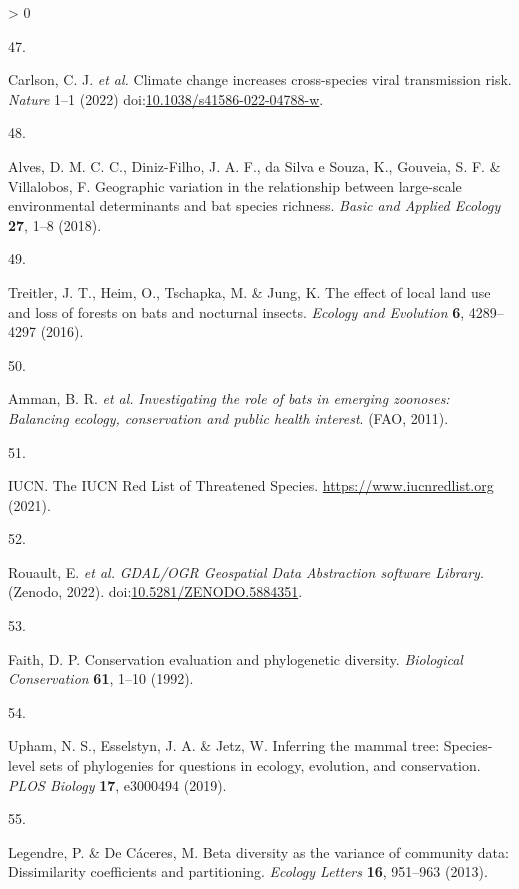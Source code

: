 \documentclass[11pt]{article}
\newlength{\cslhangindent}
\newlength{\csllabelwidth}
\newenvironment{CSLReferences}[3] %
 {%
  \setlength{\parindent}{0pt}
  \ifodd #1 \everypar{\setlength{\hangindent}{\cslhangindent}}\ignorespaces\fi
  \ifnum #2 > 0
  \setlength{\parskip}{#2\baselineskip}
  \fi
 }%
 {}
\newcommand{\CSLLeftMargin}[1]{\parbox[t]{\maxof{\widthof{#1}}{\csllabelwidth}}{#1}}
\newcommand{\CSLRightInline}[1]{\parbox[t]{\linewidth}{#1}}
\begin{document}
\begin{CSLReferences}{0}{0}
\leavevmode\hypertarget{ref-Carlson2022CliCha}{}%
\CSLLeftMargin{47. }
\CSLRightInline{Carlson, C. J. \emph{et al.} Climate change increases
cross-species viral transmission risk. \emph{Nature} 1--1 (2022)
doi:\href{https://doi.org/10.1038/s41586-022-04788-w}{10.1038/s41586-022-04788-w}.}

\leavevmode\hypertarget{ref-Alves2018GeoVar}{}%
\CSLLeftMargin{48. }
\CSLRightInline{Alves, D. M. C. C., Diniz-Filho, J. A. F., da Silva e
Souza, K., Gouveia, S. F. \& Villalobos, F. Geographic variation in the
relationship between large-scale environmental determinants and bat
species richness. \emph{Basic and Applied Ecology} \textbf{27}, 1--8
(2018).}

\leavevmode\hypertarget{ref-Treitler2016EffLoc}{}%
\CSLLeftMargin{49. }
\CSLRightInline{Treitler, J. T., Heim, O., Tschapka, M. \& Jung, K. The
effect of local land use and loss of forests on bats and nocturnal
insects. \emph{Ecology and Evolution} \textbf{6}, 4289--4297 (2016).}

\leavevmode\hypertarget{ref-Amman2011InvRol}{}%
\CSLLeftMargin{50. }
\CSLRightInline{Amman, B. R. \emph{et al.} \emph{Investigating the role
of bats in emerging zoonoses: Balancing ecology, conservation and public
health interest}. (FAO, 2011).}

\leavevmode\hypertarget{ref-IUCN2021IucRed}{}%
\CSLLeftMargin{51. }
\CSLRightInline{IUCN. The IUCN Red List of Threatened Species.
\url{https://www.iucnredlist.org} (2021).}

\leavevmode\hypertarget{ref-RouaultEven2022GdaOgr}{}%
\CSLLeftMargin{52. }
\CSLRightInline{Rouault, E. \emph{et al.} \emph{GDAL/OGR Geospatial Data
Abstraction software Library}. (Zenodo, 2022).
doi:\href{https://doi.org/10.5281/ZENODO.5884351}{10.5281/ZENODO.5884351}.}

\leavevmode\hypertarget{ref-Faith1992ConEva}{}%
\CSLLeftMargin{53. }
\CSLRightInline{Faith, D. P. Conservation evaluation and phylogenetic
diversity. \emph{Biological Conservation} \textbf{61}, 1--10 (1992).}

\leavevmode\hypertarget{ref-Upham2019InfMam}{}%
\CSLLeftMargin{54. }
\CSLRightInline{Upham, N. S., Esselstyn, J. A. \& Jetz, W. Inferring the
mammal tree: Species-level sets of phylogenies for questions in ecology,
evolution, and conservation. \emph{PLOS Biology} \textbf{17}, e3000494
(2019).}

\leavevmode\hypertarget{ref-Legendre2013BetDiv}{}%
\CSLLeftMargin{55. }
\CSLRightInline{Legendre, P. \& De Cáceres, M. Beta diversity as the
variance of community data: Dissimilarity coefficients and partitioning.
\emph{Ecology Letters} \textbf{16}, 951--963 (2013).}


\end{CSLReferences}
\end{document}
